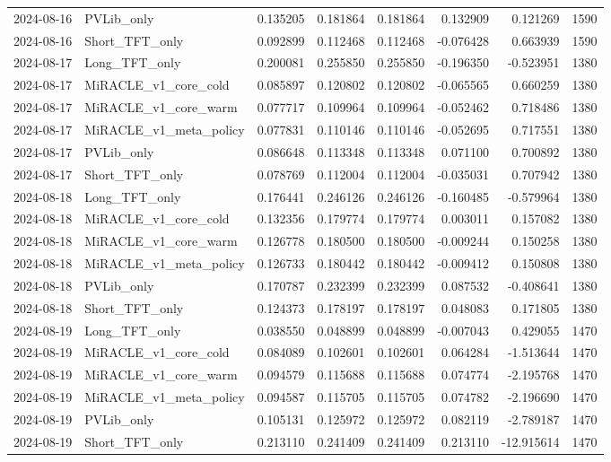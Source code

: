 \begin{tabular}{llrrrrrr}
2024-08-16 & PVLib_only & 0.135205 & 0.181864 & 0.181864 & 0.132909 & 0.121269 & 1590 \\
2024-08-16 & Short_TFT_only & 0.092899 & 0.112468 & 0.112468 & -0.076428 & 0.663939 & 1590 \\
2024-08-17 & Long_TFT_only & 0.200081 & 0.255850 & 0.255850 & -0.196350 & -0.523951 & 1380 \\
2024-08-17 & MiRACLE_v1_core_cold & 0.085897 & 0.120802 & 0.120802 & -0.065565 & 0.660259 & 1380 \\
2024-08-17 & MiRACLE_v1_core_warm & 0.077717 & 0.109964 & 0.109964 & -0.052462 & 0.718486 & 1380 \\
2024-08-17 & MiRACLE_v1_meta_policy & 0.077831 & 0.110146 & 0.110146 & -0.052695 & 0.717551 & 1380 \\
2024-08-17 & PVLib_only & 0.086648 & 0.113348 & 0.113348 & 0.071100 & 0.700892 & 1380 \\
2024-08-17 & Short_TFT_only & 0.078769 & 0.112004 & 0.112004 & -0.035031 & 0.707942 & 1380 \\
2024-08-18 & Long_TFT_only & 0.176441 & 0.246126 & 0.246126 & -0.160485 & -0.579964 & 1380 \\
2024-08-18 & MiRACLE_v1_core_cold & 0.132356 & 0.179774 & 0.179774 & 0.003011 & 0.157082 & 1380 \\
2024-08-18 & MiRACLE_v1_core_warm & 0.126778 & 0.180500 & 0.180500 & -0.009244 & 0.150258 & 1380 \\
2024-08-18 & MiRACLE_v1_meta_policy & 0.126733 & 0.180442 & 0.180442 & -0.009412 & 0.150808 & 1380 \\
2024-08-18 & PVLib_only & 0.170787 & 0.232399 & 0.232399 & 0.087532 & -0.408641 & 1380 \\
2024-08-18 & Short_TFT_only & 0.124373 & 0.178197 & 0.178197 & 0.048083 & 0.171805 & 1380 \\
2024-08-19 & Long_TFT_only & 0.038550 & 0.048899 & 0.048899 & -0.007043 & 0.429055 & 1470 \\
2024-08-19 & MiRACLE_v1_core_cold & 0.084089 & 0.102601 & 0.102601 & 0.064284 & -1.513644 & 1470 \\
2024-08-19 & MiRACLE_v1_core_warm & 0.094579 & 0.115688 & 0.115688 & 0.074774 & -2.195768 & 1470 \\
2024-08-19 & MiRACLE_v1_meta_policy & 0.094587 & 0.115705 & 0.115705 & 0.074782 & -2.196690 & 1470 \\
2024-08-19 & PVLib_only & 0.105131 & 0.125972 & 0.125972 & 0.082119 & -2.789187 & 1470 \\
2024-08-19 & Short_TFT_only & 0.213110 & 0.241409 & 0.241409 & 0.213110 & -12.915614 & 1470 \\

\end{tabular}

